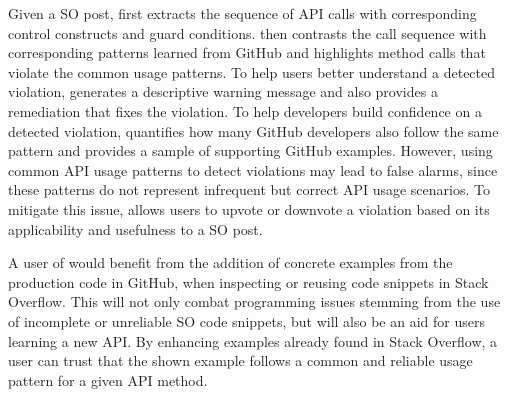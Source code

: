 Given a SO post, {\tool} first extracts the sequence of API calls with corresponding control constructs and guard conditions. {\tool} then contrasts the call sequence with corresponding patterns learned from GitHub and highlights method calls that violate the common usage patterns. To help users better understand a detected violation, {\tool} generates a descriptive warning message and also provides a remediation that fixes the violation. To help developers build confidence on a detected violation, {\tool} quantifies how many GitHub developers also follow the same pattern and provides a sample of supporting GitHub examples. However, using common API usage patterns to detect violations may lead to false alarms, since these patterns do not represent infrequent but correct API usage scenarios. To mitigate this issue, {\tool} allows users to upvote or downvote a violation based on its applicability and usefulness to a SO post.

A user of {\tool} would benefit from the addition of concrete examples from the production code in GitHub, when inspecting or reusing code snippets in Stack Overflow. This will not only combat programming issues stemming from the use of incomplete or unreliable SO code snippets, but will also be an aid for users learning a new API. By enhancing examples already found in Stack Overflow, a user can trust that the shown example follows a common and reliable usage pattern for a given API method.

%
